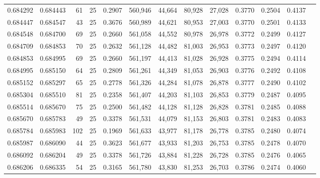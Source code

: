 \begin{tabular}{rrrrrrrrrrrrr}
0.684292 & 0.684443 &    61 &  25 &                                     0.2907 & 560,946 &  44,664 &  80,928 &  27,028 & 0.3770 & 0.2504 & 0.4137 \\
0.684447 & 0.684547 &    43 &  25 &                                     0.3676 & 560,989 &  44,621 &  80,953 &  27,003 & 0.3770 & 0.2501 & 0.4133 \\
0.684548 & 0.684700 &    69 &  25 &                                     0.2660 & 561,058 &  44,552 &  80,978 &  26,978 & 0.3772 & 0.2499 & 0.4127 \\
0.684709 & 0.684853 &    70 &  25 &                                     0.2632 & 561,128 &  44,482 &  81,003 &  26,953 & 0.3773 & 0.2497 & 0.4120 \\
0.684853 & 0.684995 &    69 &  25 &                                     0.2660 & 561,197 &  44,413 &  81,028 &  26,928 & 0.3775 & 0.2494 & 0.4114 \\
0.684995 & 0.685150 &    64 &  25 &                                     0.2809 & 561,261 &  44,349 &  81,053 &  26,903 & 0.3776 & 0.2492 & 0.4108 \\
0.685152 & 0.685297 &    65 &  25 &                                     0.2778 & 561,326 &  44,284 &  81,078 &  26,878 & 0.3777 & 0.2490 & 0.4102 \\
0.685304 & 0.685510 &    81 &  25 &                                     0.2358 & 561,407 &  44,203 &  81,103 &  26,853 & 0.3779 & 0.2487 & 0.4095 \\
0.685514 & 0.685670 &    75 &  25 &                                     0.2500 & 561,482 &  44,128 &  81,128 &  26,828 & 0.3781 & 0.2485 & 0.4088 \\
0.685670 & 0.685783 &    49 &  25 &                                     0.3378 & 561,531 &  44,079 &  81,153 &  26,803 & 0.3781 & 0.2483 & 0.4083 \\
0.685784 & 0.685983 &   102 &  25 &                                     0.1969 & 561,633 &  43,977 &  81,178 &  26,778 & 0.3785 & 0.2480 & 0.4074 \\
0.685987 & 0.686090 &    44 &  25 &                                     0.3623 & 561,677 &  43,933 &  81,203 &  26,753 & 0.3785 & 0.2478 & 0.4070 \\
0.686092 & 0.686204 &    49 &  25 &                                     0.3378 & 561,726 &  43,884 &  81,228 &  26,728 & 0.3785 & 0.2476 & 0.4065 \\
0.686206 & 0.686335 &    54 &  25 &                                     0.3165 & 561,780 &  43,830 &  81,253 &  26,703 & 0.3786 & 0.2474 & 0.4060 \\

\end{tabular}

